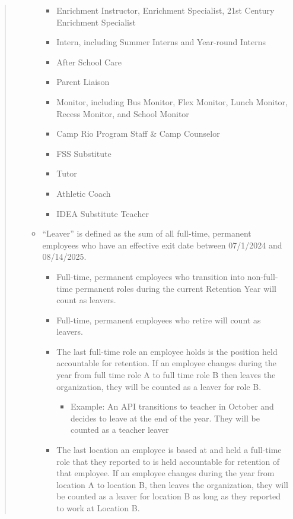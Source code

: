 \documentclass[
  letterpaper,
  DIV=11,
  numbers=noendperiod]{scrreprt}
\providecommand{\tightlist}{%
  \setlength{\itemsep}{0pt}\setlength{\parskip}{0pt}}
\begin{document}
\begin{quote}
\begin{itemize}
\begin{itemize}
    \begin{itemize}
    \tightlist
    \item
      Enrichment Instructor, Enrichment Specialist, 21st Century
      Enrichment Specialist
    \item
      Intern, including Summer Interns and Year-round Interns
    \item
      After School Care
    \item
      Parent Liaison
    \item
      Monitor, including Bus Monitor, Flex Monitor, Lunch Monitor,
      Recess Monitor, and School Monitor
    \item
      Camp Rio Program Staff \& Camp Counselor
    \item
      FSS Substitute
    \item
      Tutor
    \item
      Athletic Coach
    \item
      IDEA Substitute Teacher
    \end{itemize}
  \item
    ``Leaver'' is defined as the sum of all full-time, permanent
    employees who have an effective exit date between 07/1/2024 and
    08/14/2025.

    \begin{itemize}
    \tightlist
    \item
      Full-time, permanent employees who transition into non-full-time
      permanent roles during the current Retention Year will count as
      leavers.
    \item
      Full-time, permanent employees who retire will count as leavers.
    \item
      The last full-time role an employee holds is the position held
      accountable for retention. If an employee changes during the year
      from full time role A to full time role B then leaves the
      organization, they will be counted as a leaver for role B.

      \begin{itemize}
      \tightlist
      \item
        Example: An API transitions to teacher in October and decides to
        leave at the end of the year. They will be counted as a teacher
        leaver
      \end{itemize}
    \item
      The last location an employee is based at and held a full-time
      role that they reported to is held accountable for retention of
      that employee. If an employee changes during the year from
      location A to location B, then leaves the organization, they will
      be counted as a leaver for location B as long as they reported to
      work at Location B.


\end{itemize}
\end{itemize}
\end{itemize}
\end{quote}
\end{document}

